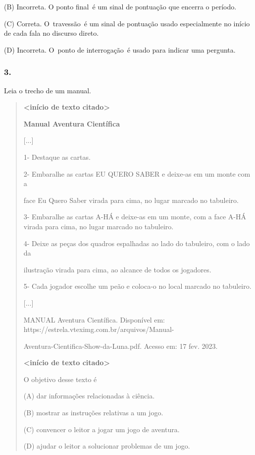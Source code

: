 (B) Incorreta. O ponto final~é um sinal de pontuação que encerra o
período.

(C) Correta. O~travessão~é um sinal de pontuação usado especialmente no
início de cada fala no discurso direto.

(D) Incorreta. O~ponto de interrogação~é usado para indicar uma
pergunta.

\subsubsection{3.}\label{section-38}

Leia o trecho de um manual.

\begin{quote}
\textbf{\textless{}início de texto citado\textgreater{}}

\textbf{Manual Aventura Científica}

{[}...{]}

1- Destaque as cartas.

2- Embaralhe as cartas EU QUERO SABER e deixe-as em um monte com a

face Eu Quero Saber virada para cima, no lugar marcado no tabuleiro.

3- Embaralhe as cartas A-HÁ e deixe-as em um monte, com a face A-HÁ
virada para cima, no lugar marcado no tabuleiro.

4- Deixe as peças dos quadros espalhadas ao lado do tabuleiro, com o
lado da

ilustração virada para cima, ao alcance de todos os jogadores.

5- Cada jogador escolhe um peão e coloca-o no local marcado no
tabuleiro.

{[}...{]}

MANUAL Aventura Científica. Disponível em:
https://estrela.vteximg.com.br/arquivos/Manual-

Aventura-Cientifica-Show-da-Luna.pdf. Acesso em: 17 fev. 2023.

\textbf{\textless{}início de texto citado\textgreater{}}

O objetivo desse texto é

(A) dar informações relacionadas à ciência.

(B) mostrar as instruções relativas a um jogo.

(C) convencer o leitor a jogar um jogo de aventura.

(D) ajudar o leitor a solucionar problemas de um jogo.
\end{quote}

